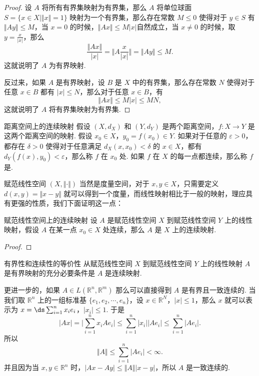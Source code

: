 \begin{proof}
    设 $A$ 将所有有界集映射为有界集，那么 $A$ 将单位球面 $S=\{x\in X\vert\Vert x\Vert=1\}$ 映射为一个有界集，那么存在常数 $M\leqslant 0$ 使得对于 $y\in S$ 有 $\Vert Ay\Vert\leqslant M$，当 $x = 0$ 的时候，$\Vert Ax\Vert \leqslant M\vert x\vert$自然成立，当 $x \neq 0$ 的时候，取 $y=\frac{x}{\vert x\vert}$，那么 \[\frac{\Vert Ax\Vert}{\vert x\vert} = \Vert A\frac{x}{\vert x\vert}\Vert = \Vert Ay\Vert \leqslant M.\] 这就说明了 $A$ 为有界映射.

    反过来，如果 $A$ 是有界映射，设 $B$ 是 $X$ 中的有界集，那么存在常数 $N$ 使得对于任意 $x\in B$ 都有 $\vert x\vert\leqslant N$，那么对于任意 $x\in B$，有 \[\Vert Ax\Vert\leqslant M\vert x\vert\leqslant MN,\]这就说明了 $A$ 将有界集映射为有界集.
\end{proof}

\begin{definition}{距离空间上的连续映射}{}
    假设 $(X,d_X)$ 和 $(Y, d_Y)$ 是两个距离空间，$f: X\to Y$ 是这两个距离空间的映射. 假设 $x_0\in X$，$y_0 = f(x_0)\in Y$. 如果对于任意的 $\varepsilon>0$，都存在 $\delta>0$ 使得对于任意满足 $d_X(x, x_0) < \delta$ 的 $x\in X$，都有 $d_Y(f(x), y_0) < \varepsilon$，那么称 $f$ 在 $x_0$ 处. 如果 $f$ 在 $X$ 的每一点都连续，那么称 $f$ 是.
\end{definition}

赋范线性空间 $(X, \Vert \cdot \Vert)$ 当然是度量空间，对于 $x, y\in X$，只需要定义 $d(x, y) = \Vert x-y\Vert$ 就可以得到一个度量，而线性映射相比于一般的映射，理应具有更强的性质，我们下面证明这一点：

\begin{theorem}{赋范线性空间上的连续映射}{}
    设 $A$ 是赋范线性空间 $X$ 到赋范线性空间 $Y$ 上的线性映射，假设 $A$ 在某一点 $x_0\in X$ 处连续，那么 $A$ 是 $X$ 上的连续映射.
\end{theorem}

\begin{proof}

\end{proof}

\begin{theorem}{有界性和连续性的等价性}{}
    从赋范线性空间 $X$ 到赋范线性空间 $Y$ 上的线性映射 $A$ 是有界映射的充分必要条件是 $A$ 是连续映射.
\end{theorem}

更进一步的，如果 $A\in L(\mathbb{R}^n, \mathbb{R}^m)$ 那么可以直接得到 $A$ 是有界且一致连续的. 当我们取 $\mathbb{R}^n$ 上的一组标准基 $\{e_1, e_2, \cdots, e_n\}$，设 $x\in \mathbb{R}^N$，$\vert x\vert \leqslant 1$，那么 $x$ 就可以表示为 $x = \ds\sum_{i=1}^{n} x_ie_i$，$\vert x_i \vert \leq 1$. 于是
\[\vert Ax\vert = \vert \sum_{i=1}^{n} x_iAe_i\vert \leqslant \sum_{i=1}^{n}\vert x_i\vert\vert Ae_i\vert \leqslant \sum_{i=1}^{n}\vert Ae_i\vert.\]
所以\[\Vert A\Vert \leqslant \sum_{i=1}^{n}\vert Ae_i\vert < \infty.\]
并且因为当 $x, y\in \mathbb{R}^n$ 时，$\vert Ax - Ay \vert \leqslant \Vert A\Vert\vert x-y\vert$，所以 $A$ 是一致连续的.


